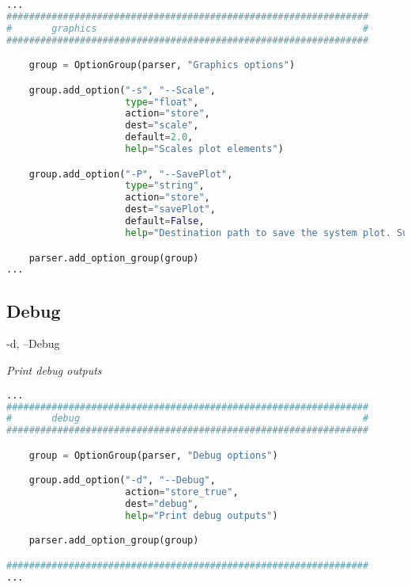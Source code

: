 \begin{inconsolata}
\begin{minipage}{\linewidth}
\begin{lstlisting}[language=python]
...
################################################################
#       graphics                                               #
################################################################

    group = OptionGroup(parser, "Graphics options")

    group.add_option("-s", "--Scale",
                     type="float",
                     action="store",
                     dest="scale",
                     default=2.0,
                     help="Scales plot elements")

    group.add_option("-P", "--SavePlot",
                     type="string",
                     action="store",
                     dest="savePlot",
                     default=False,
                     help="Destination path to save the system plot. Supported filetypes: .png, .pdf")

    parser.add_option_group(group)
...
\end{lstlisting}
\end{minipage}
\end{inconsolata}

\subsection{Debug}
\label{subsec:debug}

-d, --Debug

\textit{Print debug outputs}


\begin{inconsolata}
\begin{minipage}{\linewidth}
\begin{lstlisting}[language=python]
...
################################################################
#       debug                                                  #
################################################################

    group = OptionGroup(parser, "Debug options")

    group.add_option("-d", "--Debug",
                     action="store_true",
                     dest="debug",
                     help="Print debug outputs")

    parser.add_option_group(group)

################################################################
...
\end{lstlisting}
\end{minipage}
\end{inconsolata}


